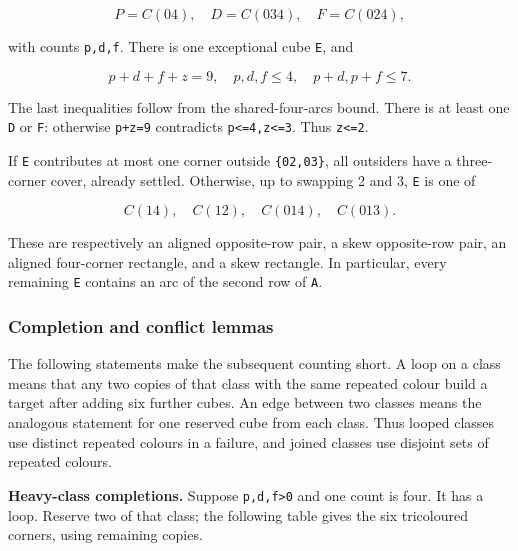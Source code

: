 \documentclass[
  10pt,
]{article}
\begin{document}
\[
P=C(04),\quad D=C(034),\quad F=C(024),
\]

with counts \texttt{p,d,f}. There is one exceptional cube \texttt{E},
and

\[
p+d+f+z=9,\quad p,d,f\le4,\quad p+d,p+f\le7.
\]

The last inequalities follow from the shared-four-arcs bound. There is
at least one \texttt{D} or \texttt{F}: otherwise \texttt{p+z=9}
contradicts \texttt{p\textless{}=4,z\textless{}=3}. Thus
\texttt{z\textless{}=2}.

If \texttt{E} contributes at most one corner outside \texttt{\{02,03\}},
all outsiders have a three-corner cover, already settled. Otherwise, up
to swapping 2 and 3, \texttt{E} is one of

\[
C(14),\quad C(12),\quad C(014),\quad C(013).
\]

These are respectively an aligned opposite-row pair, a skew opposite-row
pair, an aligned four-corner rectangle, and a skew rectangle. In
particular, every remaining \texttt{E} contains an arc of the second row
of \texttt{A}.

\hypertarget{completion-and-conflict-lemmas}{%
\subsubsection*{Completion and conflict
lemmas}\label{completion-and-conflict-lemmas}}

The following statements make the subsequent counting short. A loop on a
class means that any two copies of that class with the same repeated
colour build a target after adding six further cubes. An edge between
two classes means the analogous statement for one reserved cube from
each class. Thus looped classes use distinct repeated colours in a
failure, and joined classes use disjoint sets of repeated colours.

\textbf{Heavy-class completions.} Suppose \texttt{p,d,f\textgreater{}0}
and one count is four. It has a loop. Reserve two of that class; the
following table gives the six tricoloured corners, using remaining
copies.
\end{document}
